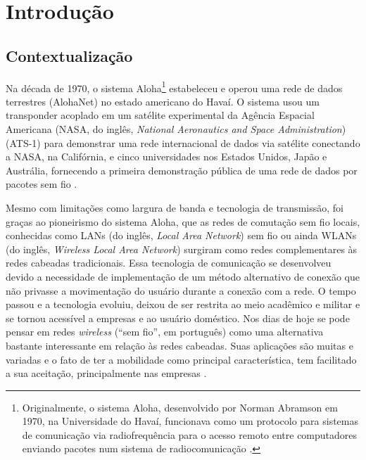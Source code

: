 \chapter{Introdução}
\label{cap:introducao}

\section{Contextualização}
\label{sec:contextualizacao}

Na década de 1970, o sistema Aloha\footnote{Originalmente, o sistema Aloha, desenvolvido por Norman Abramson em 1970, na Universidade do Havaí, funcionava como um protocolo para sistemas de comunicação via radiofrequência para o acesso remoto entre computadores enviando pacotes num sistema de radiocomunicação \cite{abramson1970acm,haykin2008}.} estabeleceu e operou uma rede de dados terrestres (AlohaNet) no estado americano do Havaí. O sistema usou um transponder acoplado em um satélite experimental da Agência Espacial Americana (NASA, do inglês, \textit{National Aeronautics and Space Administration}) (ATS-1) para demonstrar uma rede internacional de dados via satélite conectando a NASA, na Califórnia, e cinco universidades nos Estados Unidos, Japão e Austrália, fornecendo a primeira demonstração pública de uma rede de dados por pacotes sem fio \cite{abramson1970acm,SchwartzAbramson2009ieee}.

Mesmo com limitações como largura de banda e tecnologia de transmissão, foi graças ao pioneirismo do sistema Aloha, que as redes de comutação sem fio locais, conhecidas como LANs (do inglês, \textit{Local Area Network}) sem fio ou ainda WLANs (do inglês, \textit{Wireless Local Area Network}) surgiram como redes complementares às redes cabeadas tradicionais. Essa tecnologia de comunicação se desenvolveu devido a necessidade de implementação de um método alternativo de conexão que não privasse a movimentação do usuário durante a conexão com a rede. O tempo passou e a tecnologia evoluiu, deixou de ser restrita ao meio acadêmico e militar e se tornou acessível a empresas e ao usuário doméstico. Nos dias de hoje se pode pensar em redes \textit{wireless} (``sem fio'', em português) como uma alternativa bastante interessante em relação às redes cabeadas. Suas aplicações são muitas e variadas e o fato de ter a mobilidade como principal característica, tem facilitado a sua aceitação, principalmente nas empresas \cite{farias2005}.

